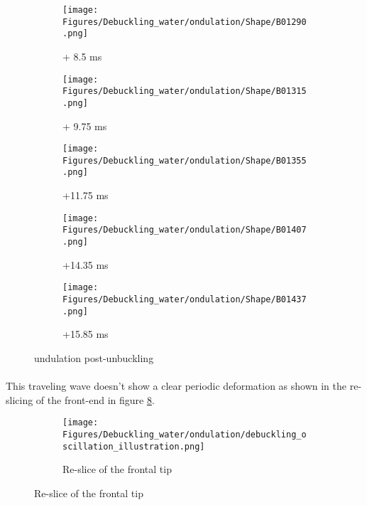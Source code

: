 \documentclass[a4paper,10pt]{report}
\begin{document}
\begin{figure}[htbp]
		\begin{subfigure}[h]{0.2\textwidth}%
        \texttt{[image: Figures/Debuckling\_water/ondulation/Shape/B01290.png]}%
        \caption{+ 8.5 ms}%
				\label{fig:UnbucklingVelocityField}%
    \end{subfigure}%
		\begin{subfigure}[h]{0.2\textwidth}%
        \texttt{[image: Figures/Debuckling\_water/ondulation/Shape/B01315.png]}%
        \caption{+ 9.75 ms}%
				\label{fig:UnbucklingVelocityField}%
    \end{subfigure}%
		\begin{subfigure}[h]{0.2\textwidth}%
        \texttt{[image: Figures/Debuckling\_water/ondulation/Shape/B01355.png]}%
        \caption{+11.75 ms}%
				\label{fig:UnbucklingVelocityField}%
    \end{subfigure}%
		\begin{subfigure}[h]{0.2\textwidth}%
        \texttt{[image: Figures/Debuckling\_water/ondulation/Shape/B01407.png]}%
        \caption{+14.35 ms}%
				\label{fig:UnbucklingVelocityField}%
    \end{subfigure}%
		\begin{subfigure}[h]{0.2\textwidth}%
        \texttt{[image: Figures/Debuckling\_water/ondulation/Shape/B01437.png]}%
        \caption{+15.85 ms}%
				\label{fig:UnbucklingVelocityField}%
    \end{subfigure}%
		\caption{undulation post-unbuckling}%
		\label{fig:Ondulationpostunbuckling}%
\end{figure}
\paragraph{}
This traveling wave doesn't show a clear periodic deformation as shown in the re-slicing of the front-end in figure \ref{fig:ondulationReslicefront}.
\begin{figure}[htbp]%
	\centering%
	 \begin{subfigure}[h]{0.2\textwidth}%
        \texttt{[image: Figures/Debuckling\_water/ondulation/debuckling\_oscillation\_illustration.png]}%
        \caption{Re-slice of the frontal tip}%
				\label{fig:ondulationReslicefront}%
    \end{subfigure}%
\end{figure}
\end{document}
